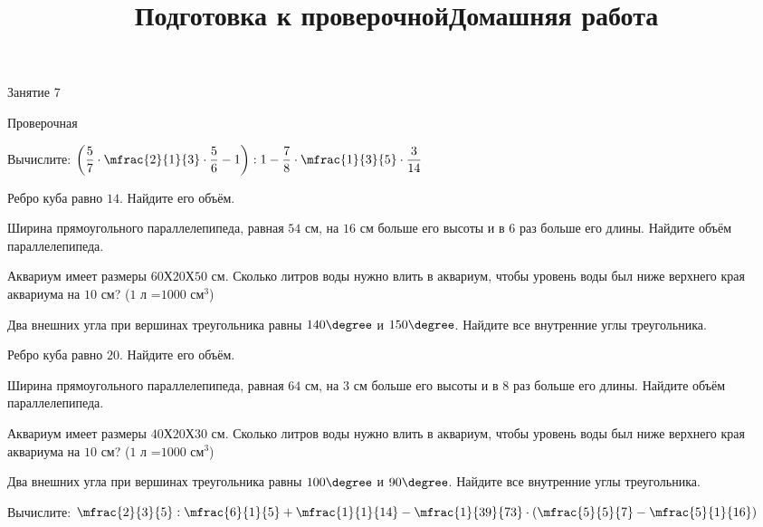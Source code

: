 \begin{class}[number=7]
	\title{Подготовка к проверочной}
	\begin{listofex}
		\item Занятие 7
	\end{listofex}
\end{class}

\begin{exam}
	\begin{listofex}
		\item Проверочная
	\end{listofex}
\end{exam}

\begin{consultation}
	\begin{listofex}
		\item Вычислите: \quad \( \left( \dfrac{5}{7}\cdot\mfrac{2}{1}{3}\cdot\dfrac{5}{6}-1 \right):1-\dfrac{7}{8}\cdot\mfrac{1}{3}{5}\cdot\dfrac{3}{14} \)
		\item Ребро куба равно \( 14 \). Найдите его объём.
		\item Ширина прямоугольного параллелепипеда, равная \( 54 \) см, на \( 16 \) см больше его высоты и в \( 6 \) раз больше его длины. Найдите объём параллелепипеда.
		\item Аквариум имеет размеры \( 60 \)Х\( 20 \)Х\( 50 \) см. Сколько литров воды нужно влить в аквариум, чтобы уровень воды был ниже верхнего края аквариума на \( 10 \) см? (\( 1 \) л =\( 1000 \) см\( ^3 \))
		\item Два внешних угла при вершинах треугольника равны \( 140\degree \) и \( 150\degree \). Найдите все внутренние углы треугольника.
	\end{listofex}
	\newpage
	\title{Домашняя работа}
	\begin{listofex}
	\item Ребро куба равно \( 20 \). Найдите его объём.
	\item Ширина прямоугольного параллелепипеда, равная \( 64 \) см, на \( 3 \) см больше его высоты и в \( 8 \) раз больше его длины. Найдите объём параллелепипеда.
	\item Аквариум имеет размеры \( 40 \)Х\( 20 \)Х\( 30 \) см. Сколько литров воды нужно влить в аквариум, чтобы уровень воды был ниже верхнего края аквариума на \( 10 \) см? (\( 1 \) л =\( 1000 \) см\( ^3 \))
	\item Два внешних угла при вершинах треугольника равны \( 100\degree \) и \( 90\degree \). Найдите все внутренние углы треугольника.
	\item Вычислите: \quad \( \mfrac{2}{3}{5}:\mfrac{6}{1}{5}+\mfrac{1}{1}{14}-\mfrac{1}{39}{73}\cdot\left( \mfrac{5}{5}{7}-\mfrac{5}{1}{16} \right) \)
	\end{listofex}
\end{consultation}

